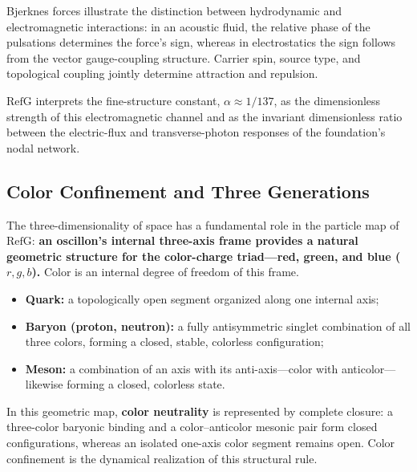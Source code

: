 \documentclass[11pt,a4paper]{article}
\newcommand{\RefG}{\mathrm{RefG}}
\begin{document}
Bjerknes forces \citep{bjerknes1906} illustrate the distinction between hydrodynamic and electromagnetic interactions: in an acoustic fluid, the relative phase of the pulsations determines the force's sign, whereas in electrostatics the sign follows from the vector gauge-coupling structure. Carrier spin, source type, and topological coupling jointly determine attraction and repulsion.

$\RefG$ interprets the fine-structure constant, $\alpha\approx1/137$, as the dimensionless strength of this electromagnetic channel and as the invariant dimensionless ratio between the electric-flux and transverse-photon responses of the foundation's nodal network.

\subsection{Color Confinement and Three Generations}

The three-dimensionality of space has a fundamental role in the particle map of $\RefG$: \textbf{an oscillon's internal three-axis frame provides a natural geometric structure for the color-charge triad---red, green, and blue ($r,g,b$).} Color is an internal degree of freedom of this frame.
\begin{itemize}
\item \textbf{Quark:} a topologically open segment organized along one internal axis;
\item \textbf{Baryon (proton, neutron):} a fully antisymmetric singlet combination of all three colors, forming a closed, stable, colorless configuration;
\item \textbf{Meson:} a combination of an axis with its anti-axis---color with anticolor---likewise forming a closed, colorless state.
\end{itemize}

In this geometric map, \textbf{color neutrality} is represented by complete closure: a three-color baryonic binding and a color--anticolor mesonic pair form closed configurations, whereas an isolated one-axis color segment remains open. Color confinement is the dynamical realization of this structural rule.
\end{document}
